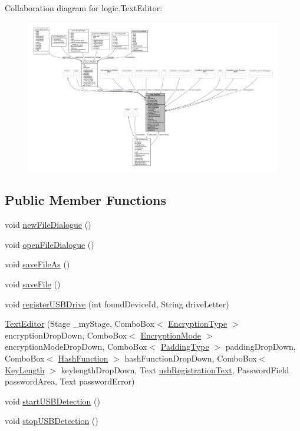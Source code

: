 Collaboration diagram for logic.\+Text\+Editor\+:\nopagebreak
\begin{figure}[H]
\begin{center}
\leavevmode
\includegraphics[width=350pt]{classlogic_1_1_text_editor__coll__graph}
\end{center}
\end{figure}
\subsection*{Public Member Functions}
\begin{DoxyCompactItemize}
\item 
void \mbox{\hyperlink{classlogic_1_1_text_editor_aad7f5f3f95ab498ee16d09f0f198c0c9}{new\+File\+Dialogue}} ()
\item 
void \mbox{\hyperlink{classlogic_1_1_text_editor_ae6690cbd84b9162df386bb319690a810}{open\+File\+Dialogue}} ()
\item 
void \mbox{\hyperlink{classlogic_1_1_text_editor_a0581e73a9b3b6ae54a8e69de49fb9ed5}{save\+File\+As}} ()
\item 
void \mbox{\hyperlink{classlogic_1_1_text_editor_ae11be4a147a095ce667576ce50f210b2}{save\+File}} ()
\item 
void \mbox{\hyperlink{classlogic_1_1_text_editor_aeb8b26927002020f35d2dc6cc8ececfe}{register\+U\+S\+B\+Drive}} (int found\+Device\+Id, String drive\+Letter)
\item 
\mbox{\hyperlink{classlogic_1_1_text_editor_a3bea784ecea25cb30c6229ff87f42aa6}{Text\+Editor}} (Stage \+\_\+my\+Stage, Combo\+Box$<$ \mbox{\hyperlink{enumenums_1_1_encryption_type}{Encryption\+Type}} $>$ encryption\+Drop\+Down, Combo\+Box$<$ \mbox{\hyperlink{enumenums_1_1_encryption_mode}{Encryption\+Mode}} $>$ encryption\+Mode\+Drop\+Down, Combo\+Box$<$ \mbox{\hyperlink{enumenums_1_1_padding_type}{Padding\+Type}} $>$ padding\+Drop\+Down, Combo\+Box$<$ \mbox{\hyperlink{enumenums_1_1_hash_function}{Hash\+Function}} $>$ hash\+Function\+Drop\+Down, Combo\+Box$<$ \mbox{\hyperlink{enumenums_1_1_key_length}{Key\+Length}} $>$ keylength\+Drop\+Down, Text \mbox{\hyperlink{classlogic_1_1_text_editor_ac75c41480833a18c2cfd0f569cf10a45}{usb\+Registration\+Text}}, Password\+Field password\+Area, Text password\+Error)
\item 
void \mbox{\hyperlink{classlogic_1_1_text_editor_a2f6a603d1650e3a718598a46c64c3c6d}{start\+U\+S\+B\+Detection}} ()
\item 
void \mbox{\hyperlink{classlogic_1_1_text_editor_a6f0bfd6368a5cb94a2b0fe8699892772}{stop\+U\+S\+B\+Detection}} ()
\end{DoxyCompactItemize}

